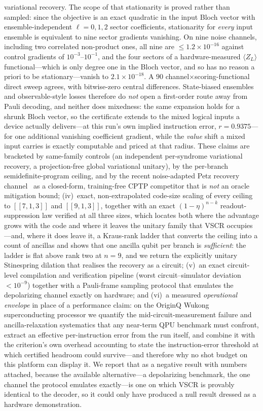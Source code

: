 \documentclass[aps,prxquantum,reprint,superscriptaddress]{revtex4-2}
\begin{document}
variational recovery. The scope of that stationarity is proved rather than
sampled: since the objective is an exact quadratic in the input Bloch vector with
ensemble-independent $\ell=0,1,2$ sector coefficients, stationarity for
\emph{every} input ensemble is equivalent to nine sector gradients vanishing. On
nine noise channels, including two correlated non-product ones, all nine are
$\le1.2\times10^{-16}$ against control gradients of $10^{-3}$--$10^{-1}$, and the
four sectors of a hardware-measured $\langle Z_L\rangle$ functional---which is
only degree one in the Bloch vector, and so has no reason a priori to be
stationary---vanish to $2.1\times10^{-18}$. A $90$
channel$\times$scoring-functional direct sweep agrees, with bitwise-zero central
differences. State-biased ensembles and observable-style losses therefore do
\emph{not} open a first-order route away from Pauli decoding, and neither does
mixedness: the same expansion holds for a shrunk Bloch vector, so the certificate
extends to the mixed logical inputs a device actually delivers---at this run's own
implied instruction error, $r=0.9375$---for one additional vanishing coefficient
gradient, while the \emph{value} shift a mixed input carries is exactly computable
and priced at that radius. These claims are bracketed by same-family controls (an
independent per-syndrome variational recovery, a projection-free global
variational unitary), by the per-branch semidefinite-program ceiling, and by the
recent noise-adapted Petz recovery channel~\cite{biswas_petz} as a closed-form,
training-free CPTP competitor that is \emph{not} an oracle mitigation bound;
(iv)~exact, non-extrapolated code-size scaling of every ceiling to
$[\![7,1,3]\!]$ and $[\![9,1,3]\!]$, together with an exact
$(1-\eta)^{n-k}$ readout-suppression law verified at all three sizes, which
locates both where the advantage grows with the code and where it leaves the
unitary family that VSCR occupies---and, where it does leave it, a Kraus-rank
ladder that converts the ceiling into a count of ancillas and shows that one
ancilla qubit per branch is \emph{sufficient}: the ladder is flat above rank two
at $n=9$, and we return the explicitly unitary Stinespring dilation that realises
the recovery as a circuit;
(v)~an exact circuit-level compilation and
verification pipeline (worst circuit--simulator deviation $<10^{-9}$) together
with a Pauli-frame sampling protocol that emulates the depolarizing channel
exactly on hardware; and (vi)~a measured \emph{operational envelope} in place of a
performance claim: on the OriginQ Wukong superconducting processor we quantify the
mid-circuit-measurement failure and ancilla-relaxation systematics that any
near-term QPU benchmark must confront, extract an effective per-instruction error
from the run itself, and combine it with the criterion's own overhead accounting to
state the instruction-error threshold at which certified headroom could survive---and
therefore why no shot budget on this platform can display it. We report that as a
negative result with numbers attached, because the available alternative---a
depolarizing benchmark, the one channel the protocol emulates exactly---is one on
which VSCR is provably identical to the decoder, so it could only have produced a
null result dressed as a hardware demonstration.
\end{document}
